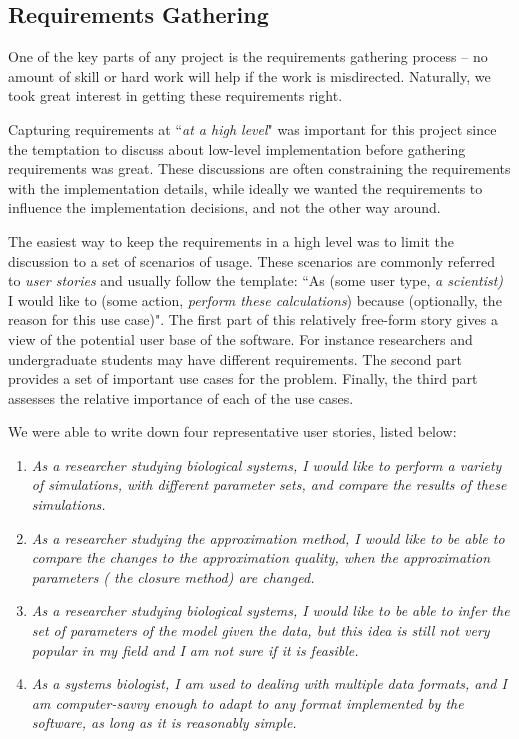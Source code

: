 \subsection{Requirements Gathering}
\label{sec:requirements-gathering}
One of the key parts of any project is the requirements gathering process -- no amount of skill or hard work will help if the work is misdirected.
Naturally, we took great interest in getting these requirements right.

Capturing requirements at ``\emph{at a high level}" was important for this project since the temptation to discuss about low-level implementation before gathering requirements was great.
These discussions are often constraining the requirements with the implementation details, while ideally we wanted the requirements to influence the implementation decisions, and not the other way around.

The easiest way to keep the requirements in a high level was to limit the discussion to a set of scenarios of usage.
These scenarios are commonly referred to \emph{user stories} and usually follow the template: ``As (some user type, \eg{} \emph{a scientist)} I would like to (some action, \eg{} \emph{perform these calculations}) because (optionally, the reason for this use case)".
The first part of this relatively free-form story gives a view of the potential user base of the software.
For instance researchers and undergraduate students may have different requirements.
The second part provides a set of important use cases for the problem.
Finally, the third part assesses the relative importance of each of the use cases.

We were able to write down four representative user stories, listed below:
\begin{enumerate}

    \item \emph{As a researcher studying biological systems, I would like to perform a variety of simulations, with different parameter sets, and compare the results of these simulations.}

    \item \emph{As a researcher studying the approximation method, I would like to be able to compare the changes to the approximation quality, when the approximation parameters (\ie{} the closure method) are changed.}

    \item \emph{As a researcher studying biological systems, I would like to be able to infer the set of parameters of the model given the data, but this idea is still not very popular in my field and I am not sure if it is feasible.}

    \item \emph{As a systems biologist, I am used to dealing with multiple data formats, and I am computer-savvy enough to adapt to any format implemented by the software, as long as it is reasonably simple.}
\end{enumerate}

